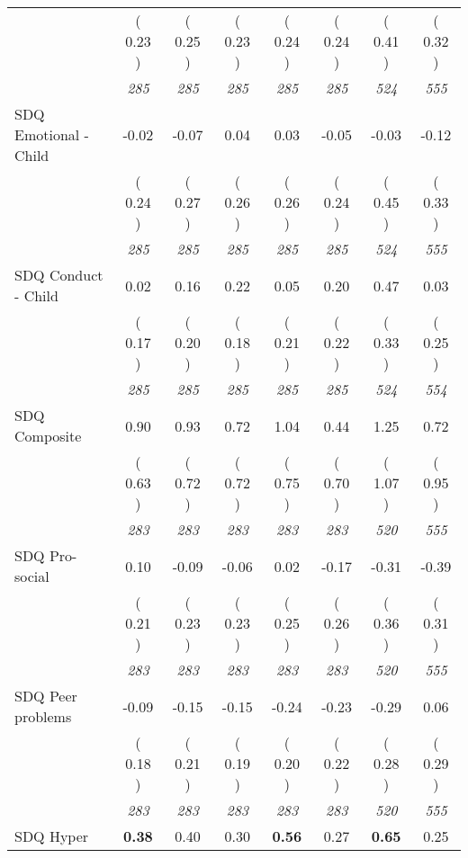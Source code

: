\begin{tabular}{l c c c c c c c}
& (     0.23 ) & (     0.25 ) & (     0.23 ) & (     0.24 ) & (     0.24 ) & (     0.41 ) & (     0.32 ) \\
& \textit{ 285 } & \textit{ 285 } & \textit{ 285 } & \textit{ 285 } & \textit{ 285 } & \textit{ 524 } & \textit{ 555 } \\
SDQ Emotional - Child &     -0.02 &     -0.07 &      0.04 &      0.03 &     -0.05 &     -0.03 &     -0.12 \\
& (     0.24 ) & (     0.27 ) & (     0.26 ) & (     0.26 ) & (     0.24 ) & (     0.45 ) & (     0.33 ) \\
& \textit{ 285 } & \textit{ 285 } & \textit{ 285 } & \textit{ 285 } & \textit{ 285 } & \textit{ 524 } & \textit{ 555 } \\
SDQ Conduct - Child &      0.02 &      0.16 &      0.22 &      0.05 &      0.20 &      0.47 &      0.03 \\
& (     0.17 ) & (     0.20 ) & (     0.18 ) & (     0.21 ) & (     0.22 ) & (     0.33 ) & (     0.25 ) \\
& \textit{ 285 } & \textit{ 285 } & \textit{ 285 } & \textit{ 285 } & \textit{ 285 } & \textit{ 524 } & \textit{ 554 } \\
SDQ Composite &      0.90 &      0.93 &      0.72 &      1.04 &      0.44 &      1.25 &      0.72 \\
& (     0.63 ) & (     0.72 ) & (     0.72 ) & (     0.75 ) & (     0.70 ) & (     1.07 ) & (     0.95 ) \\
& \textit{ 283 } & \textit{ 283 } & \textit{ 283 } & \textit{ 283 } & \textit{ 283 } & \textit{ 520 } & \textit{ 555 } \\
SDQ Pro-social &      0.10 &     -0.09 &     -0.06 &      0.02 &     -0.17 &     -0.31 &     -0.39 \\
& (     0.21 ) & (     0.23 ) & (     0.23 ) & (     0.25 ) & (     0.26 ) & (     0.36 ) & (     0.31 ) \\
& \textit{ 283 } & \textit{ 283 } & \textit{ 283 } & \textit{ 283 } & \textit{ 283 } & \textit{ 520 } & \textit{ 555 } \\
SDQ Peer problems &     -0.09 &     -0.15 &     -0.15 &     -0.24 &     -0.23 &     -0.29 &      0.06 \\
& (     0.18 ) & (     0.21 ) & (     0.19 ) & (     0.20 ) & (     0.22 ) & (     0.28 ) & (     0.29 ) \\
& \textit{ 283 } & \textit{ 283 } & \textit{ 283 } & \textit{ 283 } & \textit{ 283 } & \textit{ 520 } & \textit{ 555 } \\
SDQ Hyper & \textbf{      0.38 } &      0.40 &      0.30 & \textbf{     0.56} &      0.27 & \textbf{      0.65 } &      0.25 \\

\end{tabular}
